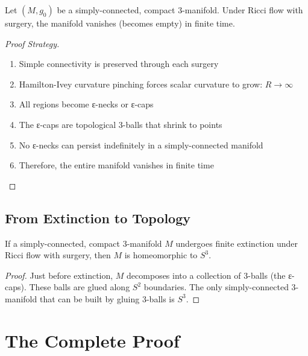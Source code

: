 \begin{theorem}
\label{thm:finite_extinction}
\leanok
{}
Let $(M, g_0)$ be a simply-connected, compact 3-manifold. Under Ricci flow with surgery, the manifold vanishes (becomes empty) in finite time.
\end{theorem}

\begin{proof}[Proof Strategy]
\begin{enumerate}
\item Simple connectivity is preserved through each surgery
\item Hamilton-Ivey curvature pinching forces scalar curvature to grow: $R \to \infty$
\item All regions become ε-necks or ε-caps
\item The ε-caps are topological 3-balls that shrink to points
\item No ε-necks can persist indefinitely in a simply-connected manifold
\item Therefore, the entire manifold vanishes in finite time
\end{enumerate}
\end{proof}

\section{From Extinction to Topology}

\begin{theorem}
\label{thm:extinction_implies_s3}
\leanok
{}
If a simply-connected, compact 3-manifold $M$ undergoes finite extinction under Ricci flow with surgery, then $M$ is homeomorphic to $S^3$.
\end{theorem}

\begin{proof}
Just before extinction, $M$ decomposes into a collection of 3-balls (the ε-caps). These balls are glued along $S^2$ boundaries. The only simply-connected 3-manifold that can be built by gluing 3-balls is $S^3$.
\end{proof}

\chapter{The Complete Proof}
\label{chap:complete_proof}


